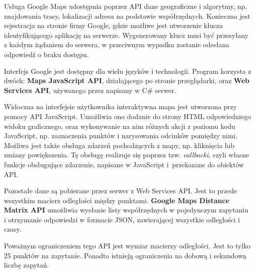 Usługa Google Maps udostępnia poprzez API dane geograficzne i algorytmy, np. znajdowania trasy, lokalizacji adresu na podstawie współrzędnych. Konieczna jest rejestracja na stronie firmy Google, gdzie możliwe jest utworzenie klucza identyfikującego aplikację na serwerze. Wygenerowany klucz musi być przesyłany z każdym żądaniem do serwera, w przeciwnym wypadku zostanie odesłana odpowiedź o braku dostępu.

Interfejs Google jest dostępny dla wielu języków i technologii. Program korzysta z dwóch: \textbf{Maps JavaScript API}, działającego po stronie przeglądarki, oraz \textbf{Web Services API}, używanego przez napisany w C\# serwer.

Widoczna na interfejsie użytkownika interaktywna mapa jest utworzona przy pomocy API JavaScript. Umożliwia ono dodanie do strony HTML odpowiedniego widoku graficznego, oraz wykonywanie na nim różnych akcji z poziomu kodu JavaScript, np. zaznaczenia punktów i narysowania odcinków pomiędzy nimi. Możliwa jest także obsługa zdarzeń pochodzących z mapy, np. kliknięcia lub zmiany powiększenia. Tę obsługę realizuje się poprzez tzw. \textit{callbacki}, czyli własne funkcje obsługujące zdarzenie, napisane w JavaScript i~przekazane do obiektów API.

Pozostałe dane są pobierane przez serwer z Web Services API. Jest to przede wszystkim macierz odległości między punktami. \textbf{Google Maps Distance Matrix API} umożliwia wysłanie listy współrzędnych w pojedynczym zapytaniu i otrzymanie odpowiedzi w formacie JSON, zawierającej wszystkie odległości i czasy.

Poważnym ograniczeniem tego API jest wymiar macierzy odległości. Jest to tylko 25 punktów na zapytanie. Ponadto istnieją ograniczenia na dobową i sekundową liczbę zapytań.